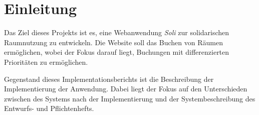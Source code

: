 
\chapter{Einleitung}
\label{ch:preface}


Das Ziel dieses Projekts ist es, eine Webanwendung \textit{Soli} zur solidarischen Raumnutzung zu entwickeln.
Die Website soll das Buchen von Räumen ermöglichen, wobei der Fokus darauf liegt, Buchungen mit differenzierten
Prioritäten zu ermöglichen.

Gegenstand dieses Implementationsberichts ist die Beschreibung der Implementierung der Anwendung.
Dabei liegt der Fokus auf den Unterschieden zwischen des Systems nach der Implementierung und der Systembeschreibung des Entwurfs- und Pflichtenhefts.